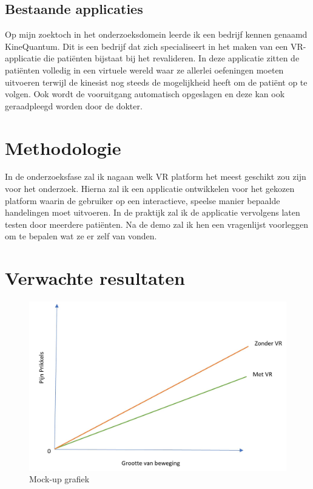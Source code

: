 \subsection{Bestaande applicaties}
Op mijn zoektoch in het onderzoeksdomein leerde ik een bedrijf kennen genaamd KineQuantum. Dit is een bedrijf dat zich specialiseert in het maken van een VR-applicatie die patiënten bijstaat bij het revalideren. In deze applicatie zitten de patiënten volledig in een virtuele wereld waar ze allerlei oefeningen moeten uitvoeren terwijl de kinesist nog steeds de mogelijkheid heeft om de patiënt op te volgen. Ook wordt de vooruitgang automatisch opgeslagen en deze kan ook geraadpleegd worden door de dokter.
\section{Methodologie}
\label{sec:methodologie}

In de onderzoeksfase zal ik nagaan welk VR platform het meest geschikt zou zijn voor het onderzoek. Hierna zal ik een applicatie ontwikkelen voor het gekozen platform waarin de gebruiker op een interactieve, speelse manier bepaalde handelingen moet uitvoeren. In de praktijk zal ik de applicatie vervolgens laten testen door meerdere patiënten. Na de demo zal ik hen een vragenlijst voorleggen om te bepalen wat ze er zelf van vonden.


\newpage
\section{Verwachte resultaten}
\label{sec:verwachte_resultaten}

\begin{figure}[h]
    \centering
    \includegraphics[scale=0.5]{mockupGraph.JPG}
    \caption{Mock-up grafiek}
    \label{graph}
\end{figure}

